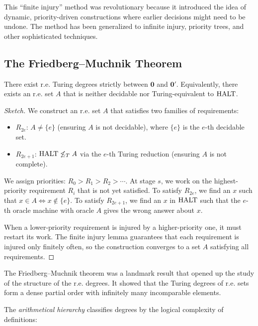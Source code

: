 This ``finite injury'' method was revolutionary because it introduced the idea of dynamic, priority-driven constructions where earlier decisions might need to be undone. The method has been generalized to infinite injury, priority trees, and other sophisticated techniques.

\subsection*{The Friedberg--Muchnik Theorem}

\begin{theorem}
There exist r.e. Turing degrees strictly between $\mathbf{0}$ and $\mathbf{0}'$. Equivalently, there exists an r.e. set $A$ that is neither decidable nor Turing-equivalent to $\text{HALT}$.
\end{theorem}

\begin{proof}[Sketch]
We construct an r.e. set $A$ that satisfies two families of requirements:
\begin{itemize}
\item $R_{2e}$: $A \neq \{e\}$ (ensuring $A$ is not decidable), where $\{e\}$ is the $e$-th decidable set.
\item $R_{2e+1}$: $\text{HALT} \not\le_T A$ via the $e$-th Turing reduction (ensuring $A$ is not complete).
\end{itemize}

We assign priorities: $R_0 > R_1 > R_2 > \cdots$. At stage $s$, we work on the highest-priority requirement $R_i$ that is not yet satisfied. To satisfy $R_{2e}$, we find an $x$ such that $x \in A \iff x \notin \{e\}$. To satisfy $R_{2e+1}$, we find an $x$ in $\text{HALT}$ such that the $e$-th oracle machine with oracle $A$ gives the wrong answer about $x$.

When a lower-priority requirement is injured by a higher-priority one, it must restart its work. The finite injury lemma guarantees that each requirement is injured only finitely often, so the construction converges to a set $A$ satisfying all requirements.
\end{proof}

The Friedberg--Muchnik theorem was a landmark result that opened up the study of the structure of the r.e. degrees. It showed that the Turing degrees of r.e. sets form a dense partial order with infinitely many incomparable elements.

The \emph{arithmetical hierarchy} classifies degrees by the logical complexity of definitions:

